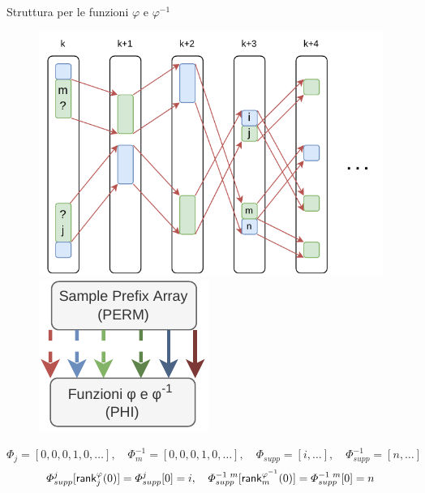 \documentclass[]{beamer}
\def\rank{\mbox{\rm {\sf rank}}}
\begin{document}
\begin{frame}[plain]{Struttura per le funzioni $\varphi$ e $\varphi^{-1}$}
  \begin{figure}[H]
    \centering
    \includegraphics[scale = 0.65, valign=t]{img/phi.pdf}
    \includegraphics[scale = 0.4, valign=t]{img/mini_phi.pdf}
  \end{figure}
  {\footnotesize{\[\varPhi_j=[0,0,0,1,0, \ldots],\quad
        \varPhi^{-1}_m=[0,0,0,1,0,\ldots],\quad
        \varPhi_{supp}=[i,\ldots],\quad
        \varPhi^{-1}_{supp}=[n,\ldots]\]}}
  \[\varPhi_{supp}^j[\rank^\varphi_j(0)]=\varPhi_{supp}^j[0]=i,\quad
    \varPhi^{-1\,\,m}_{supp}[\rank^{\varphi^{-1}}_m(0)]=\varPhi^{-1\,\,m}_{supp}[0]=n\]
  
\end{frame}
\end{document}
